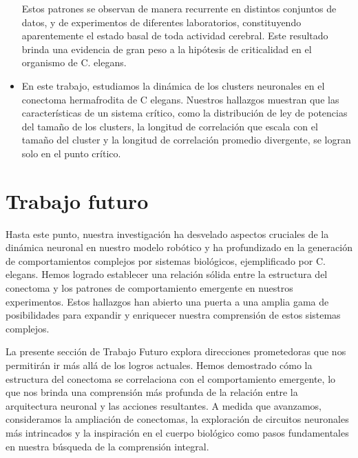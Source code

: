 \begin{itemize}
Estos patrones se observan de manera recurrente en distintos conjuntos de datos, y de experimentos de diferentes laboratorios, constituyendo aparentemente el estado basal de toda actividad cerebral. Este resultado brinda una evidencia de gran peso a la hipótesis de criticalidad en el organismo de C. elegans.

\item En este trabajo, estudiamos la dinámica de los clusters neuronales en el conectoma hermafrodita de C elegans. Nuestros hallazgos muestran que las características de un sistema crítico, como la distribución de ley de potencias del tamaño de los clusters, la longitud de correlación que escala con el tamaño del cluster y la longitud de correlación promedio divergente, se logran solo en el punto crítico.


\end{itemize}



\section{Trabajo futuro}



Hasta este punto, nuestra investigación ha desvelado aspectos cruciales de la dinámica neuronal en nuestro modelo robótico y ha profundizado en la generación de comportamientos complejos por sistemas biológicos, ejemplificado por C. elegans. Hemos logrado establecer una relación sólida entre la estructura del conectoma y los patrones de comportamiento emergente en nuestros experimentos. Estos hallazgos han abierto una puerta a una amplia gama de posibilidades para expandir y enriquecer nuestra comprensión de estos sistemas complejos.

La presente sección de Trabajo Futuro explora direcciones prometedoras que nos permitirán ir más allá de los logros actuales. Hemos demostrado cómo la estructura del conectoma se correlaciona con el comportamiento emergente, lo que nos brinda una comprensión más profunda de la relación entre la arquitectura neuronal y las acciones resultantes. A medida que avanzamos, consideramos la ampliación de conectomas, la exploración de circuitos neuronales más intrincados y la inspiración en el cuerpo biológico como pasos fundamentales en nuestra búsqueda de la comprensión integral.



